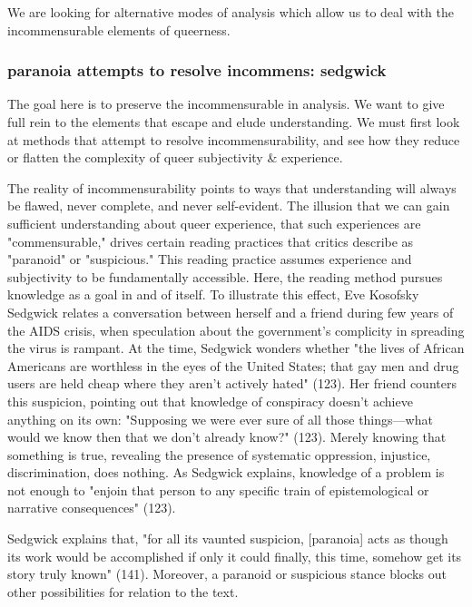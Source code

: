 \documentclass[11pt]{article}
\begin{document}
We are looking for alternative modes of analysis which allow us to
deal with the incommensurable elements of queerness.

\subsubsection{paranoia attempts to resolve incommens: sedgwick}
\label{sec:org0767671}

The goal here is to preserve the incommensurable in analysis. We want
to give full rein to the elements that escape and elude
understanding. We must first look at methods that attempt to resolve
incommensurability, and see how they reduce or flatten the complexity
of queer subjectivity \& experience.

The reality of incommensurability points to ways that understanding
will always be flawed, never complete, and never self-evident. The
illusion that we can gain sufficient understanding about queer
experience, that such experiences are "commensurable," drives certain
reading practices that critics describe as "paranoid" or "suspicious."
This reading practice assumes experience and subjectivity to be
fundamentally accessible. Here, the reading method pursues knowledge
as a goal in and of itself. To illustrate this effect, Eve Kosofsky
Sedgwick relates a conversation between herself and a friend during
few years of the AIDS crisis, when speculation about the government's
complicity in spreading the virus is rampant. At the time, Sedgwick
wonders whether "the lives of African Americans are worthless in the
eyes of the United States; that gay men and drug users are held cheap
where they aren't actively hated" (123). Her friend counters this
suspicion, pointing out that knowledge of conspiracy doesn't achieve
anything on its own: "Supposing we were ever sure of all those
things---what would we know then that we don't already know?"
(123). Merely knowing that something is true, revealing the presence
of systematic oppression, injustice, discrimination, does nothing. As
Sedgwick explains, knowledge of a problem is not enough to "enjoin
that person to any specific train of epistemological or narrative
consequences" (123).

Sedgwick explains that, "for all its vaunted suspicion, [paranoia]
acts as though its work would be accomplished if only it could
finally, this time, somehow get its story truly known"
(141). Moreover, a paranoid or suspicious stance blocks out other
possibilities for relation to the text.
\end{document}

